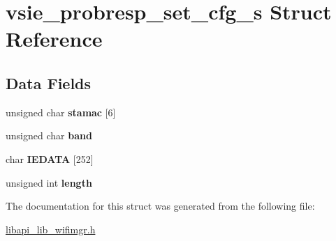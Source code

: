 \hypertarget{structvsie__probresp__set__cfg__s}{}\section{vsie\+\_\+probresp\+\_\+set\+\_\+cfg\+\_\+s Struct Reference}
\label{structvsie__probresp__set__cfg__s}
\subsection*{Data Fields}
\begin{DoxyCompactItemize}
\item 
\mbox{\label{structvsie__probresp__set__cfg__s_a66b946dd0cb7e2d33e03dd2ec43de934}} 
unsigned char {\bfseries stamac} \mbox{[}6\mbox{]}
\item 
\mbox{\label{structvsie__probresp__set__cfg__s_a8db7c530aa93520da66627a4ed0ca6c6}} 
unsigned char {\bfseries band}
\item 
\mbox{\label{structvsie__probresp__set__cfg__s_aef417c01c43e5e66a0142bec260acff0}} 
char {\bfseries I\+E\+D\+A\+TA} \mbox{[}252\mbox{]}
\item 
\mbox{\label{structvsie__probresp__set__cfg__s_a4d2a0e806f56080098a12d2329d72f42}} 
unsigned int {\bfseries length}
\end{DoxyCompactItemize}


The documentation for this struct was generated from the following file\+:\begin{DoxyCompactItemize}
\item 
\hyperlink{libapi__lib__wifimgr_8h}{libapi\+\_\+lib\+\_\+wifimgr.\+h}\end{DoxyCompactItemize}
